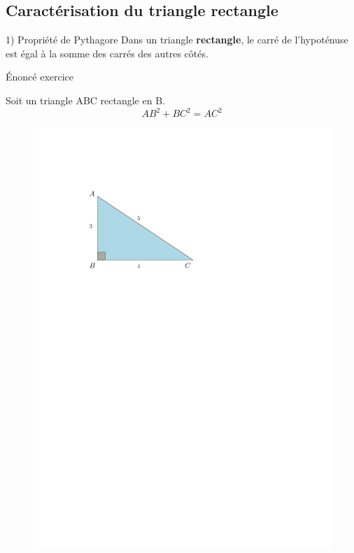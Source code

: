 \documentclass[paper=a4, fontsize=9pt]{scrartcl} %
\begin{document}
\begin{multicols}{2}

\section{Caractérisation du triangle rectangle}


\begin{Theorem}{1) Propriété de Pythagore}
    Dans un triangle \textbf{rectangle}, le carré de l’hypoténuse est égal à la somme des carrés des autres 
côtés.
 \end{Theorem}

  \begin{Proposition}{Énoncé exercice}

    Soit un triangle ABC rectangle en B. 
	$$AB^2 + BC^2 = AC^2$$

	\begin{figure}[H]
	  \centering
	  \includegraphics[width=\linewidth]{sources/1/tri-pytha.pdf}
	\end{figure}
\end{Proposition}

\end{multicols}
\end{document}
